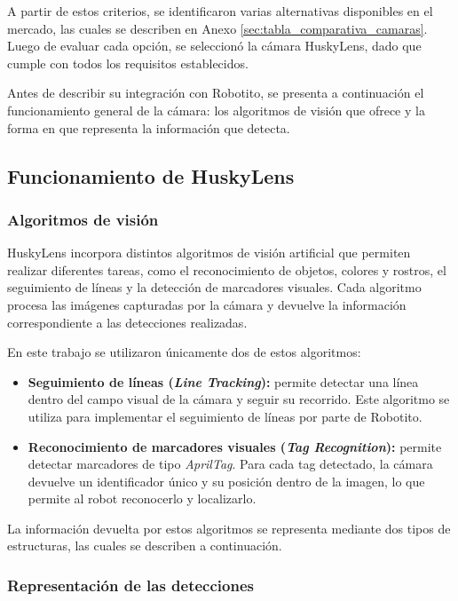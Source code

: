 \documentclass{prgrado}
\begin{document}
A partir de estos criterios, se identificaron varias alternativas disponibles en el mercado, las cuales se describen en Anexo \ref{sec:tabla_comparativa_camaras}. Luego de evaluar cada opción, se seleccionó la cámara HuskyLens, dado que cumple con todos los requisitos establecidos. 

Antes de describir su integración con Robotito, se presenta a continuación el funcionamiento general de la cámara: los algoritmos de visión que ofrece y la forma en que representa la información que detecta.

\subsection{Funcionamiento de HuskyLens}

\subsubsection{Algoritmos de visión}

HuskyLens incorpora distintos algoritmos de visión artificial que permiten realizar diferentes tareas, como el reconocimiento de objetos, colores y rostros, el seguimiento de líneas y la detección de marcadores visuales. Cada algoritmo procesa las imágenes capturadas por la cámara y devuelve la información correspondiente a las detecciones realizadas.

En este trabajo se utilizaron únicamente dos de estos algoritmos:

\begin{itemize}
    \item \textbf{Seguimiento de líneas (\textit{Line Tracking}):} permite detectar una línea dentro del campo visual de la cámara y seguir su recorrido. Este algoritmo se utiliza para implementar el seguimiento de líneas por parte de Robotito.

    \item \textbf{Reconocimiento de marcadores visuales (\textit{Tag Recognition}):} permite detectar marcadores de tipo \textit{AprilTag}. Para cada tag detectado, la cámara devuelve un identificador único y su posición dentro de la imagen, lo que permite al robot reconocerlo y localizarlo.
\end{itemize}

La información devuelta por estos algoritmos se representa mediante dos tipos de estructuras, las cuales se describen a continuación.

\subsubsection{Representación de las detecciones}
\end{document}
